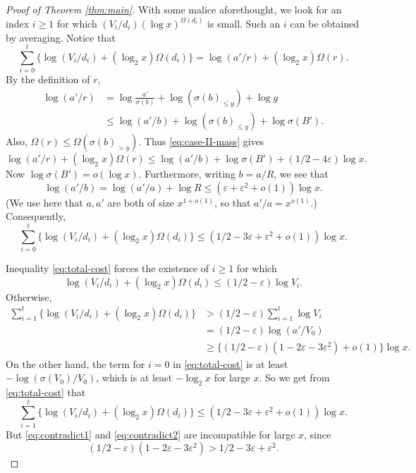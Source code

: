 \documentclass[11pt]{amsart}
\begin{document}
\begin{proof}[Proof of Theorem \ref{thm:main}]
With some malice aforethought, we look for an index $i\ge 1$ for which $(V_i/d_i) (\log{x})^{\Omega(d_i)}$ is small. Such an $i$ can be obtained by averaging. Notice that
\[
 \sum_{i=0}^t
 \{\log(V_i/d_i)+(\log_2 x)\Omega(d_i)\}
 =\log(a'/r)+(\log_2 x)\Omega(r).
\]
By the definition of $r$,
\[
\begin{aligned}
 \log(a'/r)
 &=\log\frac{a'}{\sigma(b)}
   +\log(\sigma(b)_{\le y})
   +\log{g}\\
 &\le\log(a'/b)+\log(\sigma(b)_{\le y})
   +\log\sigma(B').
\end{aligned}
\]
Also, $\Omega(r)\le\Omega(\sigma(b)_{>y})$. Thus
\eqref{eq:case-II-mass} gives
\[
 \log(a'/r)+(\log_2 x)\Omega(r)
 \le\log(a'/b)+\log\sigma(B')
    +(1/2-4\varepsilon)\log x.
\]
Now $\log\sigma(B')=o(\log x)$.  Furthermore, writing $b=a/R$, we see that
\[ \log(a'/b)=\log(a'/a)+\log R
 \le(\varepsilon+\varepsilon^2+o(1))\log x.
\]
(We use here that $a, a'$ are both of size $x^{1+o(1)}$, so that $a'/a= x^{o(1)}$.) 
Consequently,
\begin{equation}\label{eq:total-cost}
 \sum_{i=0}^t
 \{\log(V_i/d_i)+(\log_2 x)\Omega(d_i)\}
 \le(1/2-3\varepsilon+\varepsilon^2+o(1))\log x.
\end{equation}

Inequality \eqref{eq:total-cost} forces the existence of $i\ge1$ for which
\begin{equation}\label{eq:choice-dV}
 \log(V_i/d_i)+(\log_2 x)\Omega(d_i)
 \le(1/2-\varepsilon)\log V_i.
\end{equation}
Otherwise,
\begin{equation}
\begin{aligned}
 \sum_{i=1}^t
 \{\log(V_i/d_i)+(\log_2 x)\Omega(d_i)\}
 &>(1/2-\varepsilon)\sum_{i=1}^t\log V_i\\
 &=(1/2-\varepsilon)\log(a'/V_0)\\
 &\ge\{(1/2-\varepsilon)(1-2\varepsilon-3\varepsilon^2)
       +o(1)\}\log x.\label{eq:contradict1}
\end{aligned}
\end{equation}
On the other hand, the term for $i=0$ in \eqref{eq:total-cost}
is at least $-\log(\sigma(V_0)/V_0)$, which is at least $-\log_2{x}$ for large $x$. So we get from \eqref{eq:total-cost} that
\begin{equation}\label{eq:contradict2}
 \sum_{i=1}^t
 \{\log(V_i/d_i)+(\log_2 x)\Omega(d_i)\}
 \le(1/2-3\varepsilon+\varepsilon^2+o(1))\log x.
\end{equation}
But \eqref{eq:contradict1} and \eqref{eq:contradict2} are incompatible for large $x$, since
\[
 (1/2-\varepsilon)(1-2\varepsilon-3\varepsilon^2)
 >1/2-3\varepsilon+\varepsilon^2.
\]


\end{proof}
\end{document}
